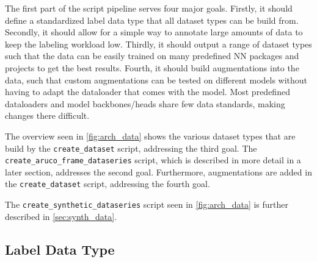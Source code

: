 \documentclass[10pt]{book}
\newcommand{\figureref}[1]{\autoref{#1}}
\begin{document}
The first part of the script pipeline serves four major goals. Firstly, it should define a standardized label data type that all dataset types can be build from. Secondly, it should allow for a simple way to annotate large amounts of data to keep the labeling workload low. Thirdly, it should output a range of dataset types such that the data can be easily trained on many predefined \ac{NN} packages and projects to get the best results. Fourth, it should build augmentations into the data, such that custom augmentations can be tested on different models without having to adapt the dataloader that comes with the model. Most predefined dataloaders and model backbones/heads share few data standards, making changes there difficult.

The overview seen in \figureref{fig:arch_data} shows the various dataset types that are build by the \texttt{create\_dataset} script, addressing the third goal. The \texttt{create\_aruco\_frame\_dataseries} script, which is described in more detail in a later section, addresses the second goal. Furthermore, augmentations are added in the \texttt{create\_dataset} script, addressing the fourth goal.

The \texttt{create\_synthetic\_dataseries} script seen in \figureref{fig:arch_data} is further described in \autoref{sec:synth_data}.

\subsection{Label Data Type}
\end{document}

